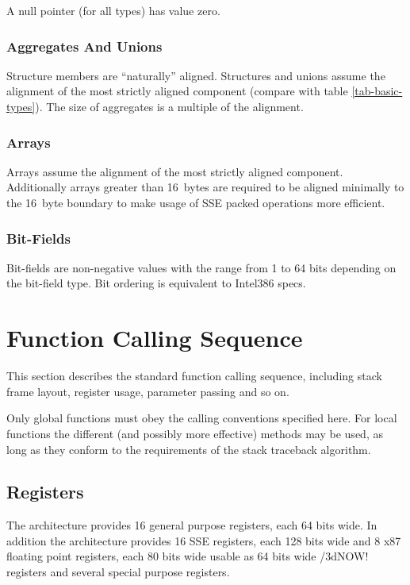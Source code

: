 A null pointer (for all types) has value zero.

\subsubsection{Aggregates And Unions}

Structure members are ``naturally'' aligned.  Structures and unions assume the
alignment of the most strictly aligned component (compare with table
\ref{tab-basic-types}).  The size of aggregates is a multiple of the alignment.

\subsubsection{Arrays}

Arrays assume the alignment of the most strictly aligned component.
Additionally arrays greater than 16~bytes are required to be aligned minimally
to the 16~byte boundary to make usage of SSE packed operations more efficient.

\subsubsection{Bit-Fields}

Bit-fields are non-negative values with the range from 1 to 64 bits
depending on the bit-field type. Bit ordering is equivalent to
Intel386 specs.


\section{Function Calling Sequence}

This section describes the standard function calling sequence,
including stack frame layout, register usage, parameter passing and so
on.

Only global functions must obey the calling conventions specified
here.  For local functions the different (and possibly more effective)
methods may be used, as long as they conform to the requirements of the
stack traceback algorithm.

\subsection{Registers}
\label{subsec-registers}

The \xARCH architecture provides 16 general purpose registers, each 64
bits wide. In addition the architecture provides 16 SSE registers,
each 128 bits wide and 8 x87 floating point registers, each 80 bits
wide usable as 64 bits wide \MMX/3dNOW! registers and several special
purpose registers.

